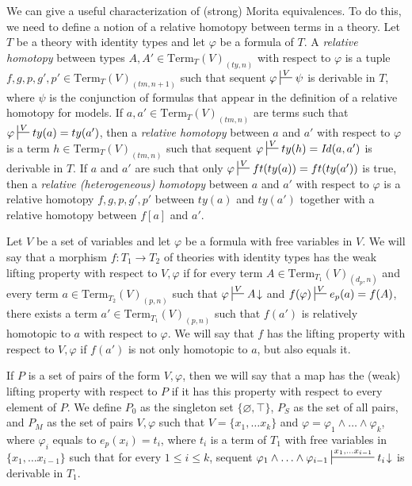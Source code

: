 \documentclass[reqno]{amsart}
\theoremstyle{definition}
\theoremstyle{remark}
\newcommand{\Term}{\mathrm{Term}}
\newcommand{\Id}{\mathit{Id}}
\numberwithin{figure}{section}
\begin{document}
We can give a useful characterization of (strong) Morita equivalences.
To do this, we need to define a notion of a relative homotopy between terms in a theory.
Let $T$ be a theory with identity types and let $\varphi$ be a formula of $T$.
A \emph{relative homotopy} between types $A,A' \in \Term_T(V)_{(ty,n)}$ with respect to $\varphi$ is a tuple $f,g,p,g',p' \in \Term_T(V)_{(tm,n+1)}$
such that sequent $\varphi \sststile{}{V} \psi$ is derivable in $T$, where $\psi$ is the conjunction of formulas that appear in the definition of a relative homotopy for models.
If $a,a' \in \Term_T(V)_{(tm,n)}$ are terms such that $\varphi \sststile{}{V} ty(a) = ty(a')$, then a \emph{relative homotopy} between $a$ and $a'$ with respect to $\varphi$ is a term $h \in \Term_T(V)_{(tm,n)}$
such that sequent $\varphi \sststile{}{V} ty(h) = \Id(a,a')$ is derivable in $T$.
If $a$ and $a'$ are such that only $\varphi \sststile{}{V} ft(ty(a)) = ft(ty(a'))$ is true, then a \emph{relative (heterogeneous) homotopy} between $a$ and $a'$ with respect to $\varphi$
is a relative homotopy $f,g,p,g',p'$ between $ty(a)$ and $ty(a')$ together with a relative homotopy between $f[a]$ and $a'$.

Let $V$ be a set of variables and let $\varphi$ be a formula with free variables in $V$.
We will say that a morphism $f : T_1 \to T_2$ of theories with identity types has the weak lifting property with respect to $V,\varphi$ if
for every term $A \in \Term_{T_1}(V)_{(d_p,n)}$ and every term $a \in \Term_{T_2}(V)_{(p,n)}$ such that $\varphi \sststile{}{V} A\!\downarrow$ and $f(\varphi) \sststile{}{V} e_p(a) = f(A)$,
there exists a term $a' \in \Term_{T_1}(V)_{(p,n)}$ such that $f(a')$ is relatively homotopic to $a$ with respect to $\varphi$.
We will say that $f$ has the lifting property with respect to $V,\varphi$ if $f(a')$ is not only homotopic to $a$, but also equals it.

If $P$ is a set of pairs of the form $V,\varphi$, then we will say that a map has the (weak) lifting property with respect to $P$ if it has this property with respect to every element of $P$.
We define $P_0$ as the singleton set $\{ \varnothing,\top \}$, $P_S$ as the set of all pairs, and $P_M$ as the set of pairs $V,\varphi$ such that $V = \{ x_1, \ldots x_k \}$
and $\varphi = \varphi_1 \land \ldots \land \varphi_k$, where $\varphi_i$ equals to $e_p(x_i) = t_i$,
where $t_i$ is a term of $T_1$ with free variables in $\{ x_1, \ldots x_{i-1} \}$ such that for every $1 \leq i \leq k$,
sequent $\varphi_1 \land \ldots \land \varphi_{i-1} \sststile{}{x_1, \ldots x_{i-1}} t_i\!\downarrow$ is derivable in $T_1$.
\end{document}
